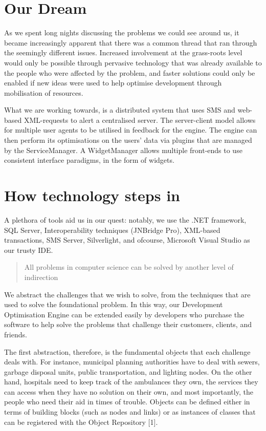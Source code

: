 \documentclass{report}
\begin{document}
\section*{Our Dream}
As we spent long nights discussing the problems we could see around us, it became increasingly apparent that there was a common thread that ran through the seemingly different issues.  Increased involvement at the grass-roots level would only be possible through pervasive technology that was already available to the people who were affected by the problem, and faster solutions could only be enabled if new ideas were used to help optimise development through mobilisation of resources.

What we are working towards, is a distributed system that uses SMS and web-based XML-requests to alert a centralised server.  The server-client model allows for multiple user agents to be utilised in feedback for the engine.  The engine can then perform its optimisations on the users' data via plugins that are managed by the ServiceManager.  A WidgetManager allows multiple front-ends to use consistent interface paradigms, in the form of widgets.

\section*{How technology steps in}
A plethora of tools aid us in our quest: notably, we use the .NET framework, SQL Server, Interoperability techniques (JNBridge Pro), XML-based transactions, SMS Server, Silverlight, and ofcourse, Microsoft Visual Studio as our trusty IDE.

\begin{quote}
All problems in computer science can be solved by another level of indirection
\end{quote}

We abstract the challenges that we wish to solve, from the techniques that are used to solve the foundational problem.  In this way, our Development Optimisation Engine can be extended easily by developers who purchase the software to help solve the problems that challenge their customers, clients, and friends.

The first abstraction, therefore, is the fundamental objects that each challenge deals with.  For instance, municipal planning authorities have to deal with sewers, garbage disposal units, public transportation, and lighting nodes.  On the other hand, hospitals need to keep track of the ambulances they own, the services they can access when they have no solution on their own, and most importantly, the people who need their aid in times of trouble.  Objects can be defined either in terms of building blocks (such as nodes and links) or as instances of classes that can be registered with the Object Repository [1]. 
\end{document}

